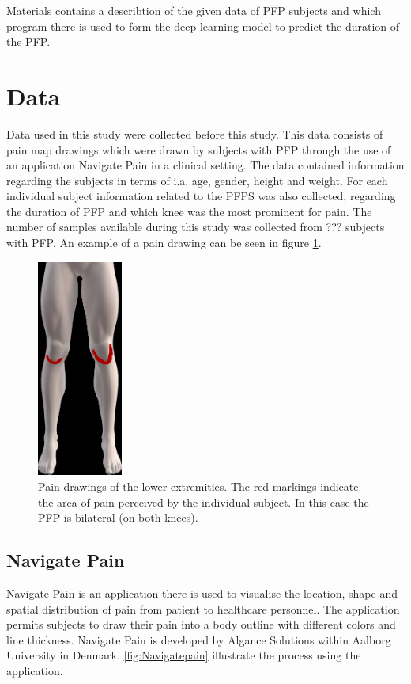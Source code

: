 Materials contains a describtion of the given data of PFP subjects and which program there is used to form the deep learning model to predict the duration of the PFP. 

\section{Data}
Data used in this study were collected before this study. This data consists of pain map drawings which were drawn by subjects with PFP through the use of an application Navigate Pain in a clinical setting. The data contained information regarding the subjects in terms of i.a. age, gender, height and weight. For each individual subject information related to the PFPS was also collected, regarding the duration of PFP and which knee was the most prominent for pain. 
The number of samples available during this study was collected from ??? subjects with PFP. An example of a pain drawing can be seen in figure \ref{fig:kneepainmap}. 

\begin{figure} [H]
\centering
\includegraphics[width=0.25\textwidth]{figures/kneepainmap}
\caption{Pain drawings of the lower extremities. The red markings indicate the area of pain perceived by the individual subject. In this case the PFP is bilateral (on both knees).}
\label{fig:kneepainmap}
\end{figure}

\subsection{Navigate Pain}
Navigate Pain is an application there is used to visualise the location, shape and spatial distribution of pain from patient to healthcare personnel. The application permits subjects to draw their pain into a body outline with different colors and line thickness. 
Navigate Pain is developed by Algance Solutions within Aalborg University in Denmark.\citep{Solutions2015}
\autoref{fig:Navigatepain} illustrate the process using the application.

